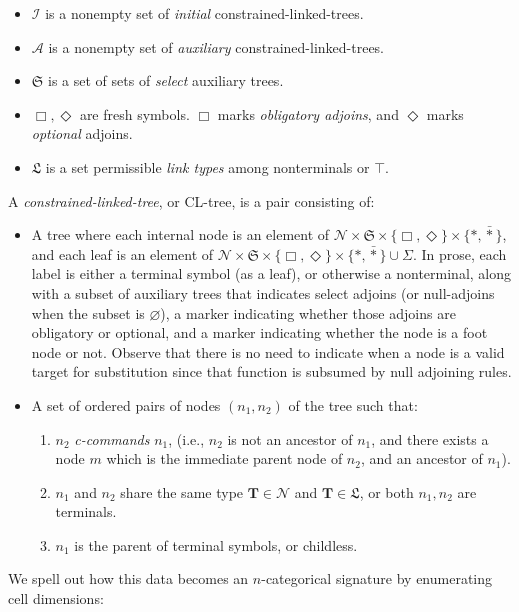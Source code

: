 \begin{fullwidth}
\begin{defn}
\begin{itemize}
\item{$\mathcal{I}$ is a nonempty set of \emph{initial} constrained-linked-trees.}
\item{$\mathcal{A}$ is a nonempty set of \emph{auxiliary} constrained-linked-trees.}
\item{$\mathfrak{S}$ is a set of sets of \emph{select} auxiliary trees.}
\item{$\Box, \Diamond$ are fresh symbols. $\Box$ marks \emph{obligatory adjoins}, and $\Diamond$ marks \emph{optional} adjoins.}
\item{$\mathfrak{L}$ is a set permissible \emph{link types} among nonterminals or $\top$.}
\end{itemize}
A \emph{constrained-linked-tree}, or CL-tree, is a pair consisting of:
\begin{itemize}
\item{A tree where each internal node is an element of $\mathcal{N} \times \mathfrak{S} \times \{\Box,\Diamond\} \times \{*, \bar{*}\}$, and each leaf is an element of $\mathcal{N} \times \mathfrak{S} \times \{\Box,\Diamond\} \times \{*, \bar{*}\} \cup \Sigma$. In prose, each label is either a terminal symbol (as a leaf), or otherwise a nonterminal, along with a subset of auxiliary trees that indicates select adjoins (or null-adjoins when the subset is $\varnothing$), a marker indicating whether those adjoins are obligatory or optional, and a marker indicating whether the node is a foot node or not. Observe that there is no need to indicate when a node is a valid target for substitution since that function is subsumed by null adjoining rules.}
\item{
A set of ordered pairs of nodes $(n_1,n_2)$ of the tree such that:
\begin{enumerate}
\item{$n_2$ \emph{c-commands} $n_1$, (i.e., $n_2$ is not an ancestor of $n_1$, and there exists a node $m$ which is the immediate parent node of $n_2$, and an ancestor of $n_1$).}
\item{$n_1$ and $n_2$ share the same type $\mathbf{T} \in \mathcal{N}$ and $\mathbf{T} \in \mathfrak{L}$, or both $n_1,n_2$ are terminals.}
\item{$n_1$ is the parent of terminal symbols, or childless.}
\end{enumerate}
}
\end{itemize}

We spell out how this data becomes an $n$-categorical signature by enumerating cell dimensions:


\end{defn}
\end{fullwidth}
